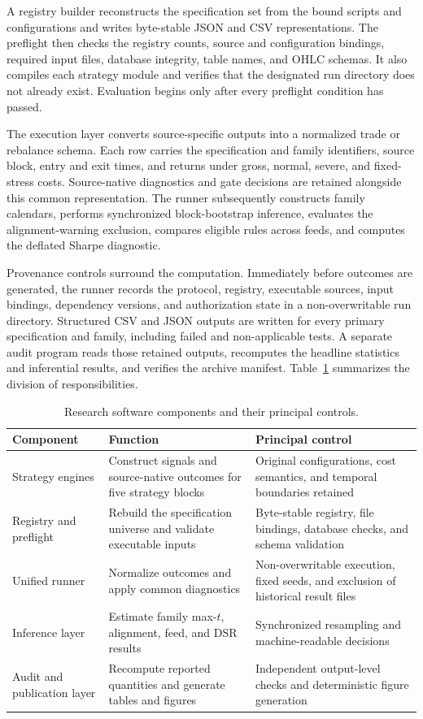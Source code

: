 A registry builder reconstructs the specification set from the bound scripts and configurations and writes byte-stable JSON and CSV representations. The preflight then checks the registry counts, source and configuration bindings, required input files, database integrity, table names, and OHLC schemas. It also compiles each strategy module and verifies that the designated run directory does not already exist. Evaluation begins only after every preflight condition has passed.

The execution layer converts source-specific outputs into a normalized trade or rebalance schema. Each row carries the specification and family identifiers, source block, entry and exit times, and returns under gross, normal, severe, and fixed-stress costs. Source-native diagnostics and gate decisions are retained alongside this common representation. The runner subsequently constructs family calendars, performs synchronized block-bootstrap inference, evaluates the alignment-warning exclusion, compares eligible rules across feeds, and computes the deflated Sharpe diagnostic.

Provenance controls surround the computation. Immediately before outcomes are generated, the runner records the protocol, registry, executable sources, input bindings, dependency versions, and authorization state in a non-overwritable run directory. Structured CSV and JSON outputs are written for every primary specification and family, including failed and non-applicable tests. A separate audit program reads those retained outputs, recomputes the headline statistics and inferential results, and verifies the archive manifest. Table~\ref{tab:software_architecture} summarizes the division of responsibilities.

\begin{table}[t]
\centering
\caption{Research software components and their principal controls.}\label{tab:software_architecture}
\small
\begin{tabular}{p{3.0cm}p{5.0cm}p{5.0cm}}
\toprule
Component & Function & Principal control \\
\midrule
Strategy engines & Construct signals and source-native outcomes for five strategy blocks & Original configurations, cost semantics, and temporal boundaries retained \\
Registry and preflight & Rebuild the specification universe and validate executable inputs & Byte-stable registry, file bindings, database checks, and schema validation \\
Unified runner & Normalize outcomes and apply common diagnostics & Non-overwritable execution, fixed seeds, and exclusion of historical result files \\
Inference layer & Estimate family max-$t$, alignment, feed, and DSR results & Synchronized resampling and machine-readable decisions \\
Audit and publication layer & Recompute reported quantities and generate tables and figures & Independent output-level checks and deterministic figure generation \\
\bottomrule
\end{tabular}
\end{table}

